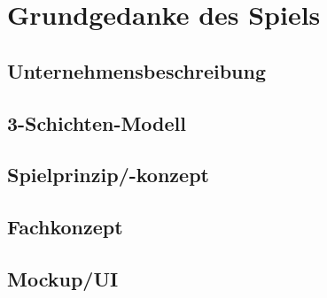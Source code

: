 \clearpage
\chapter{Grundgedanke des Spiels}
\section{Unternehmensbeschreibung}
\section{3-Schichten-Modell}
\section{Spielprinzip/-konzept}
\section{Fachkonzept}
\section{Mockup/UI}